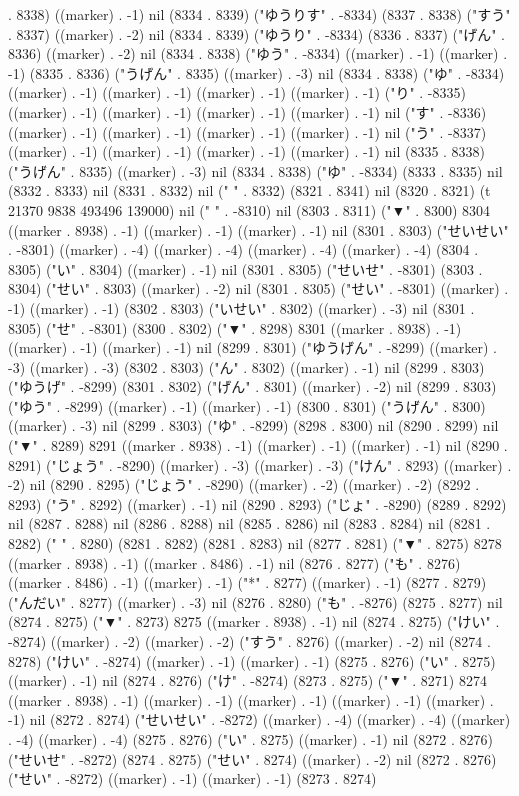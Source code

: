 . 8338) ((marker) . -1) nil (8334 . 8339) ("ゆうりす" . -8334) (8337 . 8338) ("すう" . 8337) ((marker) . -2) nil (8334 . 8339) ("ゆうり" . -8334) (8336 . 8337) ("げん" . 8336) ((marker) . -2) nil (8334 . 8338) ("ゆう" . -8334) ((marker) . -1) ((marker) . -1) (8335 . 8336) ("うげん" . 8335) ((marker) . -3) nil (8334 . 8338) ("ゆ" . -8334) ((marker) . -1) ((marker) . -1) ((marker) . -1) ((marker) . -1) ("り" . -8335) ((marker) . -1) ((marker) . -1) ((marker) . -1) ((marker) . -1) nil ("す" . -8336) ((marker) . -1) ((marker) . -1) ((marker) . -1) ((marker) . -1) nil ("う" . -8337) ((marker) . -1) ((marker) . -1) ((marker) . -1) ((marker) . -1) nil (8335 . 8338) ("うげん" . 8335) ((marker) . -3) nil (8334 . 8338) ("ゆ" . -8334) (8333 . 8335) nil (8332 . 8333) nil (8331 . 8332) nil (" " . 8332) (8321 . 8341) nil (8320 . 8321) (t 21370 9838 493496 139000) nil (" " . -8310) nil (8303 . 8311) ("▼" . 8300) 8304 ((marker . 8938) . -1) ((marker) . -1) ((marker) . -1) nil (8301 . 8303) ("せいせい" . -8301) ((marker) . -4) ((marker) . -4) ((marker) . -4) ((marker) . -4) (8304 . 8305) ("い" . 8304) ((marker) . -1) nil (8301 . 8305) ("せいせ" . -8301) (8303 . 8304) ("せい" . 8303) ((marker) . -2) nil (8301 . 8305) ("せい" . -8301) ((marker) . -1) ((marker) . -1) (8302 . 8303) ("いせい" . 8302) ((marker) . -3) nil (8301 . 8305) ("せ" . -8301) (8300 . 8302) ("▼" . 8298) 8301 ((marker . 8938) . -1) ((marker) . -1) ((marker) . -1) nil (8299 . 8301) ("ゆうげん" . -8299) ((marker) . -3) ((marker) . -3) (8302 . 8303) ("ん" . 8302) ((marker) . -1) nil (8299 . 8303) ("ゆうげ" . -8299) (8301 . 8302) ("げん" . 8301) ((marker) . -2) nil (8299 . 8303) ("ゆう" . -8299) ((marker) . -1) ((marker) . -1) (8300 . 8301) ("うげん" . 8300) ((marker) . -3) nil (8299 . 8303) ("ゆ" . -8299) (8298 . 8300) nil (8290 . 8299) nil ("▼" . 8289) 8291 ((marker . 8938) . -1) ((marker) . -1) ((marker) . -1) nil (8290 . 8291) ("じょう" . -8290) ((marker) . -3) ((marker) . -3) ("けん" . 8293) ((marker) . -2) nil (8290 . 8295) ("じょう" . -8290) ((marker) . -2) ((marker) . -2) (8292 . 8293) ("う" . 8292) ((marker) . -1) nil (8290 . 8293) ("じょ" . -8290) (8289 . 8292) nil (8287 . 8288) nil (8286 . 8288) nil (8285 . 8286) nil (8283 . 8284) nil (8281 . 8282) (" " . 8280) (8281 . 8282) (8281 . 8283) nil (8277 . 8281) ("▼" . 8275) 8278 ((marker . 8938) . -1) ((marker . 8486) . -1) nil (8276 . 8277) ("も" . 8276) ((marker . 8486) . -1) ((marker) . -1) ("*" . 8277) ((marker) . -1) (8277 . 8279) ("んだい" . 8277) ((marker) . -3) nil (8276 . 8280) ("も" . -8276) (8275 . 8277) nil (8274 . 8275) ("▼" . 8273) 8275 ((marker . 8938) . -1) nil (8274 . 8275) ("けい" . -8274) ((marker) . -2) ((marker) . -2) ("すう" . 8276) ((marker) . -2) nil (8274 . 8278) ("けい" . -8274) ((marker) . -1) ((marker) . -1) (8275 . 8276) ("い" . 8275) ((marker) . -1) nil (8274 . 8276) ("け" . -8274) (8273 . 8275) ("▼" . 8271) 8274 ((marker . 8938) . -1) ((marker) . -1) ((marker) . -1) ((marker) . -1) ((marker) . -1) nil (8272 . 8274) ("せいせい" . -8272) ((marker) . -4) ((marker) . -4) ((marker) . -4) ((marker) . -4) (8275 . 8276) ("い" . 8275) ((marker) . -1) nil (8272 . 8276) ("せいせ" . -8272) (8274 . 8275) ("せい" . 8274) ((marker) . -2) nil (8272 . 8276) ("せい" . -8272) ((marker) . -1) ((marker) . -1) (8273 . 8274) 
